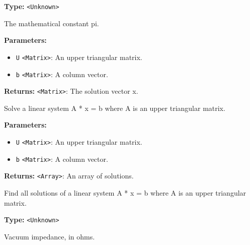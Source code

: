 \documentclass[12pt,a4paper]{article}
\begin{document}
\vspace{5mm}
\noindent {}\vspace{4mm}


\noindent \textbf{Type:} \texttt{<Unknown>}

\noindent The mathematical constant pi.

\vspace{5mm}
\noindent {}


\noindent \textbf{Parameters:}
\begin{itemize}
  \item \texttt{U} \texttt{<Matrix>}: An upper triangular matrix.
  \item \texttt{b} \texttt{<Matrix>}: A column vector.
\end{itemize}

\noindent \textbf{Returns:} \texttt{<Matrix>}: The solution vector x.

\noindent Solve a linear system A * x = b where A is an upper triangular matrix.

\vspace{5mm}
\noindent {}


\noindent \textbf{Parameters:}
\begin{itemize}
  \item \texttt{U} \texttt{<Matrix>}: An upper triangular matrix.
  \item \texttt{b} \texttt{<Matrix>}: A column vector.
\end{itemize}

\noindent \textbf{Returns:} \texttt{<Array>}: An array of solutions.

\noindent Find all solutions of a linear system A * x = b where A is an upper triangular matrix.

\vspace{5mm}
\noindent {}\vspace{4mm}


\noindent \textbf{Type:} \texttt{<Unknown>}

\noindent Vacuum impedance, in ohms.
\end{document}
